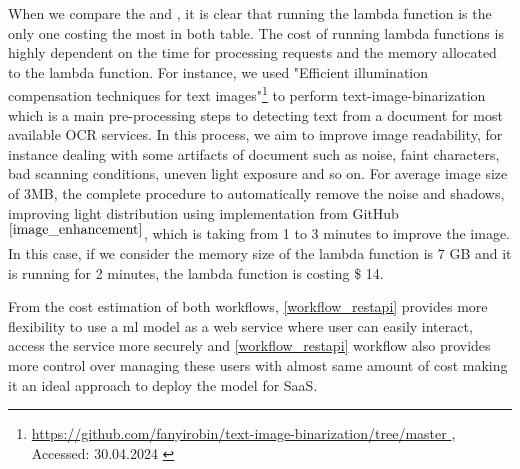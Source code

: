 When we compare the  and , it is clear that running the lambda function is the only one costing the most in both table. The cost of running lambda functions is highly dependent on the time for processing requests and the memory allocated to the lambda function. For instance, we used "Efficient illumination compensation techniques for text images"\footnote{\url{https://github.com/fanyirobin/text-image-binarization/tree/master }, Accessed: 30.04.2024 \label{image_enhancement}} to perform text-image-binarization which is a main pre-processing steps to detecting text from a document for most available OCR services. In this process, we aim to improve image readability, for instance dealing with some artifacts of document such as noise, faint characters, bad scanning conditions, uneven light exposure and so on. For average image size of 3MB, the complete procedure to automatically remove the noise and shadows, improving light distribution using implementation from GitHub\(^{\ref{image_enhancement}}\), which is taking from 1 to 3 minutes to improve the image. In this case, if we consider the memory size of the lambda function is 7 GB and it is running for 2 minutes, the lambda function is costing \$ 14.

From the cost estimation of both workflows, \ref{workflow_restapi} provides more flexibility to use a \acrshort{ml} model as a web service where user can easily interact, access the service more securely and \ref{workflow_restapi} workflow also provides more control over managing these users with almost same amount of cost making it an ideal approach to deploy the model for SaaS. 